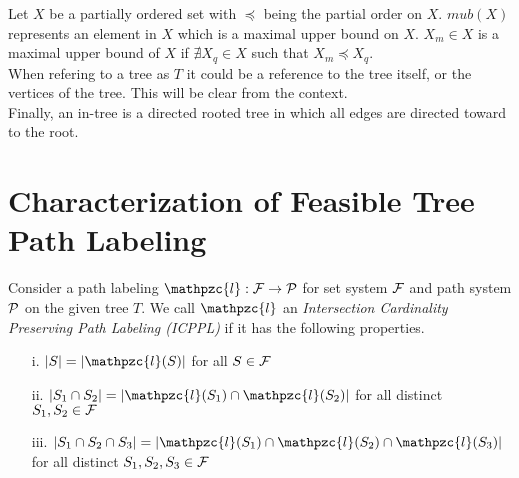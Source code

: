 \documentclass{llncs}
\def\cA{{\cal A}}
\def\cF{{\cal F}}
\def\cP{{\cal P}}
\def\cl{\mathpzc{l}}
\begin{document}
\noindent
Let $X$ be a partially ordered set with $\preccurlyeq$ being the
partial order on $X$.  $mub(X)$ represents an element in $X$ which is
a maximal upper bound on $X$.  $X_m \in X$ is a maximal upper bound of
$X$ if $\nexists X_q \in X$ such that $X_m
\preccurlyeq X_q$. \\


\noindent
When refering to a tree as $T$ it could be a reference to the tree
itself, or the vertices of the tree. This will be clear from the
context.\\

\noindent
Finally, an in-tree is a directed rooted tree in which all edges are
directed toward to the root.

\section{Characterization of Feasible Tree Path  Labeling} 
\label{feasible} 

Consider a path labeling $\cl: \cF \rightarrow \cP$ for set system $\cF$
and path system $\cP$ on the given tree $T$. We
call $\cl$ an {\em Intersection Cardinality Preserving Path Labeling
  (ICPPL)} if it has the following properties.

\begin{enumerate}
\item [i.]  $|S| = |\cl(S)|$ for all $S \in \cF$
\item [ii.] $|S_1 \cap S_2| = |\cl(S_1) \cap \cl(S_2)|$ for all
  distinct $S_1, S_2 \in \cF$
\item [iii.] $|S_1 \cap S_2 \cap S_3| = |\cl(S_1) \cap \cl(S_2) \cap
  \cl(S_3)|$ for all distinct  $S_1, S_2, S_3 \in \cF$
\end{enumerate}


\end{document}
